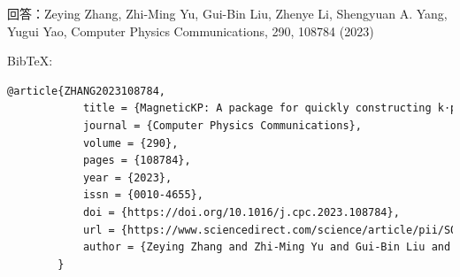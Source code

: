 \documentclass[titlepage,a4paper,12pt,AutoFakeBold]{article}
\begin{document}
\begin{enumerate}[style=nextline]
    回答：Zeying Zhang, Zhi-Ming Yu, Gui-Bin Liu, Zhenye Li, Shengyuan A. Yang, Yugui Yao,
    Computer Physics Communications, 290, 108784 (2023)
    
    BibTeX:
    \begin{lstlisting}[numbers=none,language=TeX]
    	@article{ZHANG2023108784,
    		title = {MagneticKP: A package for quickly constructing k⋅p models of magnetic and non-magnetic crystals},
    		journal = {Computer Physics Communications},
    		volume = {290},
    		pages = {108784},
    		year = {2023},
    		issn = {0010-4655},
    		doi = {https://doi.org/10.1016/j.cpc.2023.108784},
    		url = {https://www.sciencedirect.com/science/article/pii/S0010465523001297},
    		author = {Zeying Zhang and Zhi-Ming Yu and Gui-Bin Liu and Zhenye Li and Shengyuan A. Yang and Yugui Yao}
    	}
    \end{lstlisting}
\end{enumerate}
\end{document}
